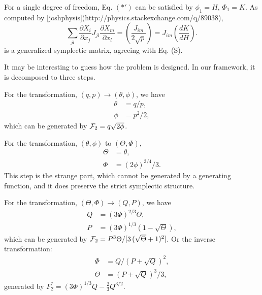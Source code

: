 \documentclass{article}
\begin{document}
For a single degree of freedom, Eq. $(*')$ can be satisfied by
$\phi_1 = H$,
$\Phi_1 = K$.
As computed by [joshphysis](http://physics.stackexchange.com/q/89038),
$$
\sum_{jl}
\frac{\partial X_i }{\partial x_j }
J_{jl}
\frac{\partial X_m }{\partial x_l }
=
\left( \frac{J_{im}}{2 \sqrt{p}} \right)
=
J_{im}\left( \frac{ dK }{ dH } \right).
$$
is a generalized symplectic matrix,
agreeing with Eq. (S).

It may be interesting to guess how the problem is designed.  In our framework, it is decomposed to three steps.

For the transformation, $(q, p) \rightarrow (\theta, \phi)$,
we have
\begin{align}
\theta &= q/p, \\
\phi &= p^2/2,
\end{align}
which can be generated by ${\cal F}_2 = q \sqrt{2 \phi}$.

For the transformation, $(\theta, \phi)$ to $(\Theta, \Phi)$,
\begin{align}
\Theta &= \theta, \\
\Phi &= (2 \phi)^{3/4}/3.
\end{align}
This step is the strange part,
which cannot be generated by a generating function,
and it does preserve the strict symplectic structure.

For the transformation, $(\Theta, \Phi) \rightarrow (Q, P)$,
we have
\begin{align}
Q &= (3 \Phi)^{2/3} \Theta, \\
P &= (3 \Phi)^{1/3} (1 - \sqrt \Theta),
\end{align}
which can be generated by ${\cal F}_2 = P^3 \Theta/[3 \, (\sqrt\Theta + 1)^2]$.
Or the inverse transformation:
\begin{align}
\Phi &= Q/(P+\sqrt{Q})^2, \\
\Theta &= (P+\sqrt{Q})^3/3,
\end{align}
generated by $F_2^* = (3 \Phi)^{1/3}Q - \frac 2 3 Q^{3/2}$.
\end{document}
